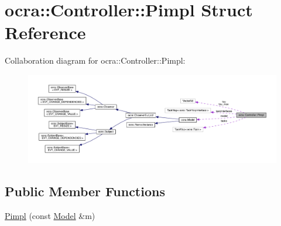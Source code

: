 \hypertarget{structocra_1_1Controller_1_1Pimpl}{}\section{ocra\+:\+:Controller\+:\+:Pimpl Struct Reference}
\label{structocra_1_1Controller_1_1Pimpl}


Collaboration diagram for ocra\+:\+:Controller\+:\+:Pimpl\+:
\nopagebreak
\begin{figure}[H]
\begin{center}
\leavevmode
\includegraphics[width=350pt]{dc/d34/structocra_1_1Controller_1_1Pimpl__coll__graph}
\end{center}
\end{figure}
\subsection*{Public Member Functions}
\begin{DoxyCompactItemize}
\item 
\hyperlink{structocra_1_1Controller_1_1Pimpl_ad59ee786ca8b100a87e797cdfc6c15f5}{Pimpl} (const \hyperlink{classocra_1_1Model}{Model} \&m)
\end{DoxyCompactItemize}
